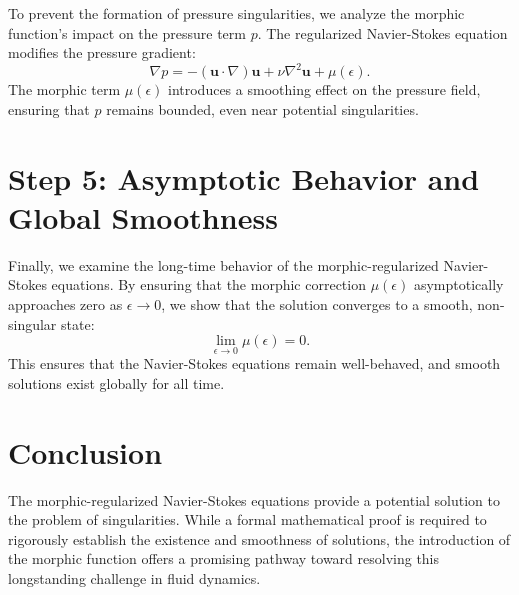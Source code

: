 \documentclass{article}
\begin{document}
To prevent the formation of pressure singularities, we analyze the morphic function's impact on the pressure term \( p \). The regularized Navier-Stokes equation modifies the pressure gradient:
\[
\nabla p = -(\mathbf{u} \cdot \nabla) \mathbf{u} + \nu \nabla^2 \mathbf{u} + \mu(\epsilon).
\]
The morphic term \( \mu(\epsilon) \) introduces a smoothing effect on the pressure field, ensuring that \( p \) remains bounded, even near potential singularities.

\section{Step 5: Asymptotic Behavior and Global Smoothness}

Finally, we examine the long-time behavior of the morphic-regularized Navier-Stokes equations. By ensuring that the morphic correction \( \mu(\epsilon) \) asymptotically approaches zero as \( \epsilon \to 0 \), we show that the solution converges to a smooth, non-singular state:
\[
\lim_{\epsilon \to 0} \mu(\epsilon) = 0.
\]
This ensures that the Navier-Stokes equations remain well-behaved, and smooth solutions exist globally for all time.

\section{Conclusion}

The morphic-regularized Navier-Stokes equations provide a potential solution to the problem of singularities. While a formal mathematical proof is required to rigorously establish the existence and smoothness of solutions, the introduction of the morphic function offers a promising pathway toward resolving this longstanding challenge in fluid dynamics.
\end{document}
